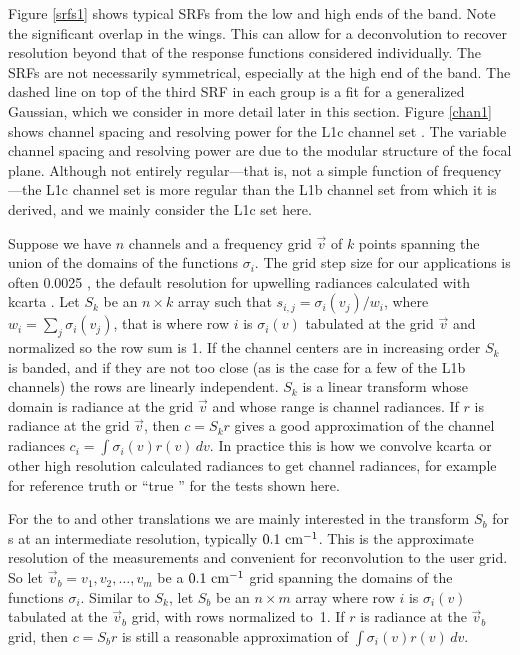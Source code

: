 \documentclass[11pt]{article}
\begin{document}
Figure \ref{srfs1} shows typical {\airs} SRFs from the low and high
ends of the band.  Note the significant overlap in the wings.  This
can allow for a deconvolution to recover resolution beyond that of
the response functions considered individually.  The SRFs are not
necessarily symmetrical, especially at the high end of the band.
The dashed line on top of the third SRF in each group is a fit for a
generalized Gaussian, which we consider in more detail later in this
section.  Figure \ref{chan1} shows channel spacing and resolving
power for the {\airs} L1c channel set \cite{airs1c}.  The variable
channel spacing and resolving power are due to the modular structure
of the focal plane.  Although not entirely regular---that is, not a
simple function of frequency---the L1c channel set is more regular
than the L1b channel set from which it is derived, and we mainly
consider the L1c set here.

Suppose we have $n$ channels and a frequency grid $\vec v$ of 
$k$ points spanning the union of the domains of the functions
$\sigma_i$.  The grid step size for our applications is often 0.0025
{\wn}, the default resolution for upwelling radiances calculated
with kcarta \cite{kcarta1}.  Let $S_k$ be an $n\times k$ array such 
that $s_{i,j} = \sigma_i(v_j)/w_i$, where $w_i = \sum_j \sigma_i(v_j)$,
that is where row $i$ is $\sigma_i(v)$ tabulated at the grid $\vec
v$ and normalized so the row sum is 1.  If the channel centers are
in increasing order $S_k$ is banded, and if they are not too close
(as is the case for a few of the L1b channels) the rows are linearly
independent.  $S_k$ is a linear transform whose domain is radiance
at the grid $\vec v$ and whose range is channel radiances.  If $r$
is radiance at the grid $\vec v$, then $c = S_k r$ gives a good
approximation of the channel radiances $c_i = \int\sigma_i(v)r(v)\,dv$.
In practice this is how we convolve kcarta or other high resolution
calculated radiances to get {\airs} channel radiances, for example
for reference truth or ``true {\airs}'' for the tests shown here.


For the {\airs} to {\cris} and other translations we are mainly
interested in the transform $S_b$ for {\srf}s at an intermediate
resolution, typically $0.1~\mbox{cm$^{-1}$}$.  This is the approximate resolution
of the {\srf} measurements and convenient for reconvolution to the
{\cris} user grid.  So let $\vec v_b = v_1,v_2,\ldots,v_m$ be a
$0.1~\mbox{cm$^{-1}$}$ grid spanning the domains of the functions $\sigma_i$.
Similar to $S_k$, let $S_b$ be an $n\times m$ array where row $i$ is
$\sigma_i(v)$ tabulated at the $\vec v_b$ grid, with rows normalized
to~1.  If $r$ is radiance at the $\vec v_b$ grid, then $c = S_b r$
is still a reasonable approximation of $\int\sigma_i(v)r(v)\,dv$.
\end{document}
